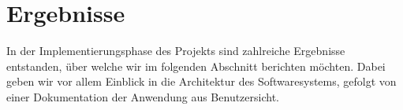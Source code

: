 \section{Ergebnisse}
\label{sec:results}

In der Implementierungsphase des Projekts sind zahlreiche Ergebnisse entstanden, über welche wir im folgenden Abschnitt berichten möchten.
Dabei geben wir vor allem Einblick in die Architektur des Softwaresystems, gefolgt von einer Dokumentation der Anwendung aus Benutzersicht.




